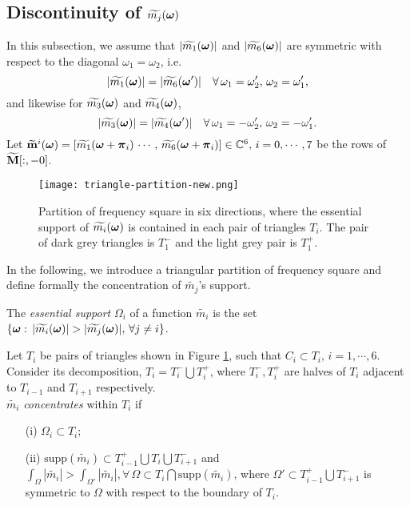 \subsection{Discontinuity of $\widetilde{m_{j}}(\boldsymbol{\omega})$}
In this subsection, we assume that
$|\widetilde{m_{1}}(\boldsymbol{\omega})|$ and $|\widetilde{m_{6}}(\boldsymbol{\omega})|$ are symmetric with respect to the diagonal $\omega_1=\omega_2$, i.e.
$$ |\widetilde{m_1}(\boldsymbol{\omega})| = |\widetilde{m_6}(\boldsymbol{\omega}')|\quad \forall\, \omega_1=\omega_2', \,\omega_2=\omega_1',$$
and likewise for $\widetilde{m_{3}}(\boldsymbol{\omega})$ and $\widetilde{m_{4}}(\boldsymbol{\omega})$,
$$ |\widetilde{m_3}(\boldsymbol{\omega})| = |\widetilde{m_4}(\boldsymbol{\omega}')|\quad \forall\, \omega_1=-\omega_2', \,\omega_2=-\omega_1'.$$
Let $\widetilde{\mathbf{m}}^{i}(\boldsymbol{\omega}) = [\widetilde{m_1}(\boldsymbol{\omega}+\boldsymbol{\pi}_i)\, \cdots,\,\widetilde{m_6}(\boldsymbol{\omega}+\boldsymbol{\pi}_i)]\in\mathbb{C}^6,\, i = 0,\cdots,7$ be the rows of $\widetilde{\mathbf{M}}[:,-0]$. 
\begin{figure}
\centering
\texttt{[image: triangle-partition-new.png]}
\caption{Partition of frequency square in six directions, where the essential support of $\widetilde{m_{i}}(\boldsymbol{\omega})$ is contained in each pair of triangles $T_i$. The pair of dark grey triangles is $T_1^-$ and the light grey pair is $T_1^+$.}
\label{fig: partition 2}
\end{figure}
In the following, we introduce a triangular partition of frequency square and define formally the concentration of $\widetilde{m_j}$'s support.

The {\it essential support} $\Omega_i$ of a function $\widetilde{m_i}$ is the set $\{\V{\omega}:\,|\widetilde{m_i}(\V{\omega})|> |\widetilde{m_j}(\V{\omega})|,\,\forall j\neq i\}$. \vspace{.5em}

Let $T_i$ be pairs of triangles shown in Figure \ref{fig: partition 2}, such that $C_i\subset T_i,\, i = 1,\cdots,6.$ Consider its decomposition, $T_i = T_i^-\bigcup T_i^+$, where $T_i^-, T_i^+$ are halves of $T_i$ adjacent  to $T_{i-1}$ and $T_{i+1}$ respectively.\\[.5em]
  $\widetilde{m_i}$ {\it concentrates} within $T_i$ if 
\begin{itemize}
\item[(i)] $\Omega_i\subset T_i$;
\item[(ii)]$\text{supp}(\widetilde{m_i})\subset T_{i-1}^+\bigcup T_i\bigcup T_{i+1}^-$ and $\int_\Omega|\widetilde{m_i}| > \int_{\Omega'}|\widetilde{m_i}|, \forall\, \Omega\subset T_i\bigcap\text{supp}(\widetilde{m_i})$, where $\Omega' \subset T_{i-1}^+\bigcup T_{i+1}^-$ is symmetric to $\Omega$ with respect to the boundary of $T_i$.
\end{itemize}

